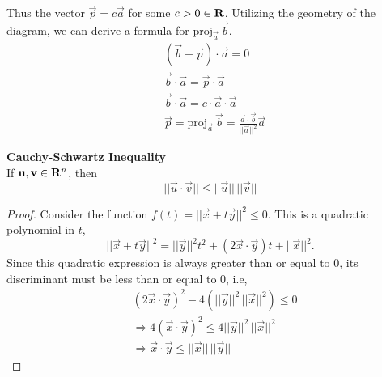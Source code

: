 \documentclass{article}
\begin{document}
	\begin{center}
	\end{center}
	Thus the vector $ \vec{p} = c\vec{a} $ for some $ c > 0 \in \mathbf{R} $. Utilizing the geometry of the diagram, we can derive a formula for $ \text{proj}_{\vec{a}} \, \vec{b} $.
	\begin{align*}
		&(\vec{b} - \vec{p}) \cdot \vec{a} = 0 \\
		&\vec{b} \cdot \vec{a} = \vec{p} \cdot \vec{a} \\ 
		&\vec{b} \cdot \vec{a} = c \cdot \vec{a} \cdot \vec{a} \\ 
		&\vec{p} = \text{proj}_{\vec{a}} \, \vec{b} = \frac{\vec{a} \cdot \vec{b}}{|| \vec{a} ||^2} \vec{a}
	\end{align*}
	
	\textbf{Cauchy-Schwartz Inequality} \\
	
	If $ \mathbf{u}, \mathbf{v} \in \mathbf{R}^n $, then
	\[
		|| \vec{u} \cdot \vec{v} || \leq ||\vec{u}|| \, ||\vec{v}||
	\]
	\begin{proof}
		Consider the function $ f(t) = ||\vec{x} + t\vec{y}||^2 \leq 0 $. This is a quadratic polynomial in $ t $,
		\[
			||\vec{x} + t\vec{y}||^2 = ||\vec{y}||^2 t^2 + (2\vec{x} \cdot \vec{y}) t + ||\vec{x}||^2.
		\]
		Since this quadratic expression is always greater than or equal to 0, its discriminant must be less than or equal to 0, i.e,
		\begin{align*}
			&(2\vec{x} \cdot \vec{y} )^2 - 4(||\vec{y}||^2 \, ||\vec{x}||^2) \leq 0 \\
			&\Rightarrow 4(\vec{x} \cdot \vec{y})^2 \leq 4||\vec{y}||^2 \, ||\vec{x}||^2 \\
			&\Rightarrow \vec{x} \cdot \vec{y} \leq ||\vec{x}|| \, ||\vec{y}||
		\end{align*}
	\end{proof}
\end{document}
